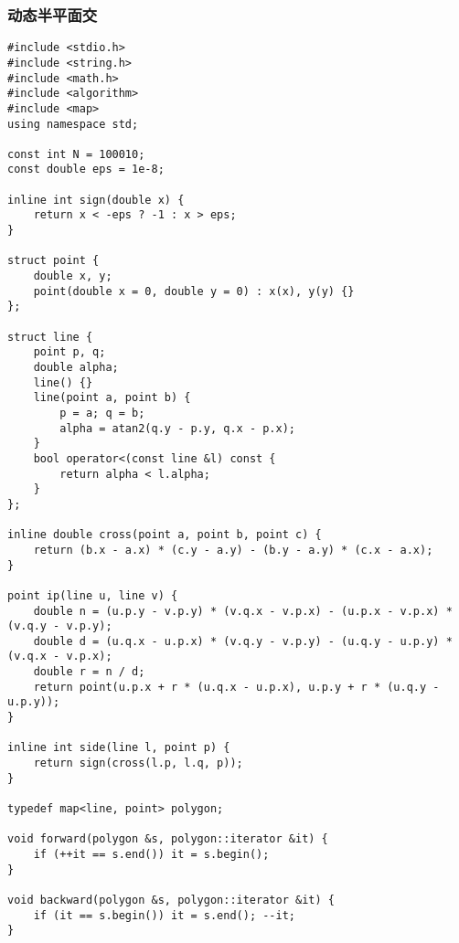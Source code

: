 \subsubsection{动态半平面交}
\begin{verbatim}
#include <stdio.h>
#include <string.h>
#include <math.h>
#include <algorithm>
#include <map>
using namespace std;

const int N = 100010;
const double eps = 1e-8;

inline int sign(double x) { 
    return x < -eps ? -1 : x > eps; 
}

struct point {
    double x, y; 
    point(double x = 0, double y = 0) : x(x), y(y) {}
};

struct line {
    point p, q;
    double alpha;
    line() {}
    line(point a, point b) {
        p = a; q = b;
        alpha = atan2(q.y - p.y, q.x - p.x);
    }
    bool operator<(const line &l) const {
        return alpha < l.alpha;
    }
};

inline double cross(point a, point b, point c) {
    return (b.x - a.x) * (c.y - a.y) - (b.y - a.y) * (c.x - a.x);
}

point ip(line u, line v) {
    double n = (u.p.y - v.p.y) * (v.q.x - v.p.x) - (u.p.x - v.p.x) * (v.q.y - v.p.y);
    double d = (u.q.x - u.p.x) * (v.q.y - v.p.y) - (u.q.y - u.p.y) * (v.q.x - v.p.x);
    double r = n / d;
    return point(u.p.x + r * (u.q.x - u.p.x), u.p.y + r * (u.q.y - u.p.y));
}

inline int side(line l, point p) {
    return sign(cross(l.p, l.q, p));
}

typedef map<line, point> polygon;

void forward(polygon &s, polygon::iterator &it) {
    if (++it == s.end()) it = s.begin();
}

void backward(polygon &s, polygon::iterator &it) {
    if (it == s.begin()) it = s.end(); --it;
}


\end{verbatim}
